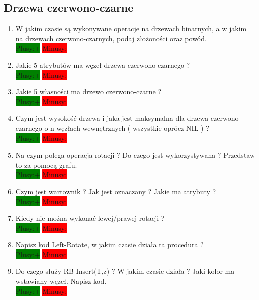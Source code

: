 \documentclass[a4paper,11pt]{article}
\begin{document}
\subsection{Drzewa czerwono-czarne}
\begin{enumerate}
\item W jakim czasie są wykonywane operacje na drzewach binarnych, a w jakim na drzewach czerwono-czarnych, podaj złożoności oraz powód.\\ \colorbox{green}{Plusy:+} \colorbox{red}{Minusy: } 

\item Jakie 5 atrybutów ma węzeł drzewa czerwono-czarnego ? \\ \colorbox{green}{Plusy:+} \colorbox{red}{Minusy: } 

\item Jakie 5 własności ma drzewo czerwono-czarne ? \\ \colorbox{green}{Plusy:+} \colorbox{red}{Minusy: } 

\item Czym jest wysokość drzewa i jaka jest maksymalna dla drzewa czerwono-czarnego o n węzłach wewnętrznych ( wszystkie oprócz NIL ) ?
\\ \colorbox{green}{Plusy:+} \colorbox{red}{Minusy: } 

\item Na czym polega operacja rotacji ? Do czego jest wykorzystywana ? Przedstaw to za pomocą grafu. \\ 
\colorbox{green}{Plusy:+} \colorbox{red}{Minusy: }  

\item Czym jest wartownik ? Jak jest oznaczany ? Jakie ma atrybuty ? 
\\ \colorbox{green}{Plusy:+} \colorbox{red}{Minusy: } 

\item Kiedy nie można wykonać lewej/prawej rotacji ? \\ \colorbox{green}{Plusy:+} \colorbox{red}{Minusy: } 

\item Napisz kod Left-Rotate, w jakim czasie działa ta procedura ? 
\\ \colorbox{green}{Plusy:+} \colorbox{red}{Minusy: } 

\item Do czego służy RB-Insert(T,z) ? W jakim czasie działa ? Jaki kolor ma wstawiany węzeł. Napisz kod. 
\\ \colorbox{green}{Plusy:+} \colorbox{red}{Minusy: } 


\end{enumerate}
\end{document}
